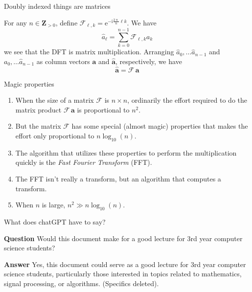 \documentclass[portrait,fleqn,12pt]{beamer}
\newcommand{\integers}{\mathbf{Z}}
\newcommand{\euler}{\mathrm{e}}
\newcommand{\imag}{\mathrm{i}}
\newenvironment{handlist}
   {\begin{enumerate}[\faHandPointRight]
       \addtolength{\itemsep}{0.0\itemsep}}
     {\end{enumerate}}
\begin{document}
  \begin{frame}{Doubly indexed things are matrices}
 
 For any $n \in \integers_{>0}$, define $\mathcal{F}_{\ell, k}  = \euler^{-  \imag \frac{2 \uppi}{n}  \ell  k}$. We  have
   \begin{equation*}
      \widehat a_\ell = \sum_{k=0}^{n-1}  \mathcal{F}_{\ell, k} a_k
  \end{equation*}
  we see that the DFT is matrix multiplication. Arranging $\widehat a_0, \dots \widehat a_{n-1}$ and  
   $a_0, \dots \widehat a_{n-1}$ as column vectors $\mathbf{a}$ and  $\widehat{\mathbf{a}}$,  respectively, we have
    \begin{equation*}
      \widehat{\mathbf{a}}  = \mathcal{F} \, \mathbf{a}
  \end{equation*}
  
    \end{frame}
    
     \begin{frame}{Magic properties}
     
     \begin{handlist}
     \item When the size of a matrix $\mathcal{F}$ is $n\times n$, ordinarily  the effort required to do the matrix product $ \mathcal{F} \, \mathbf{a}$ is proportional to $n^2$.  
     
     \item But the matrix $\mathcal{F}$ has some special (almost magic) properties that 
     makes the effort only proportional to 
     $n \log_{10}( n)$.
     
     \item The algorithm that utilizes these properties to perform the multiplication quickly is the \emph{Fast Fourier Transform} (FFT).
     
     \item The FFT isn't really a transform, but an algorithm that computes a transform.
     
     \item When $n$ is large, $n^2 \gg n \log_{10}(n)$.
 
 \end{handlist}
  
    \end{frame}
    
    \begin{frame}{What does chatGPT have to say?}
    
    \textbf{Question} Would this document make for a good lecture for 3rd year computer science students?
    
    \textbf{Answer} Yes, this document could serve as a good lecture for 3rd year computer science students, particularly those interested in topics related to mathematics, signal processing, or algorithms.  (Specifics deleted).
    
    \end{frame}
\end{document}
